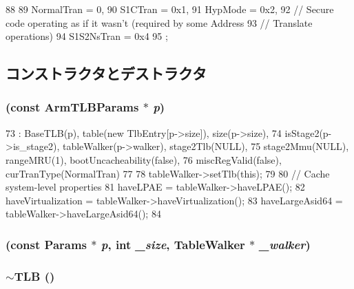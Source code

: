 \begin{DoxyCode}
88                             {
89         NormalTran = 0,
90         S1CTran = 0x1,
91         HypMode = 0x2,
92         // Secure code operating as if it wasn't (required by some Address
93         // Translate operations)
94         S1S2NsTran = 0x4
95     };
\end{DoxyCode}


\subsection{コンストラクタとデストラクタ}
\hypertarget{classArmISA_1_1TLB_a072a0e1c517c70f5baf23c7bf1aae5c6}{
\subsubsection[{TLB}]{ (const ArmTLBParams $\ast$ {\em p})}}
\label{classArmISA_1_1TLB_a072a0e1c517c70f5baf23c7bf1aae5c6}



\begin{DoxyCode}
73     : BaseTLB(p), table(new TlbEntry[p->size]), size(p->size),
74     isStage2(p->is_stage2), tableWalker(p->walker), stage2Tlb(NULL),
75     stage2Mmu(NULL), rangeMRU(1), bootUncacheability(false),
76     miscRegValid(false), curTranType(NormalTran)
77 {
78     tableWalker->setTlb(this);
79 
80     // Cache system-level properties
81     haveLPAE = tableWalker->haveLPAE();
82     haveVirtualization = tableWalker->haveVirtualization();
83     haveLargeAsid64 = tableWalker->haveLargeAsid64();
84 }
\end{DoxyCode}
\hypertarget{classArmISA_1_1TLB_a5bc074f4c969287561515e7906f422b5}{
\subsubsection[{TLB}]{ (const {\bf Params} $\ast$ {\em p}, \/  int {\em \_\-size}, \/  {\bf TableWalker} $\ast$ {\em \_\-walker})}}
\label{classArmISA_1_1TLB_a5bc074f4c969287561515e7906f422b5}
\hypertarget{classArmISA_1_1TLB_a18a1722ab7889997b15fd7b9fc33c7ff}{
\subsubsection[{$\sim$TLB}]{\setlength{\rightskip}{0pt plus 5cm}$\sim${\bf TLB} ()}}
\label{classArmISA_1_1TLB_a18a1722ab7889997b15fd7b9fc33c7ff}



